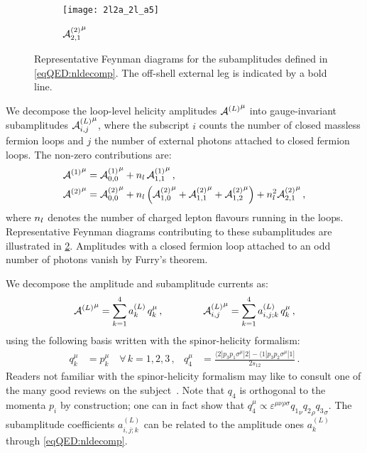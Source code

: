 \documentclass[main.tex]{subfiles}
\begin{document}
\begin{figure}
\begin{center}
\begin{subfigure}[c]{0.3\linewidth}
            \label{fig:2Lbox2}
        \end{subfigure}
        \begin{subfigure}[c]{0.3\linewidth}
            \centering
            \vspace{4ex}
            \texttt{[image: 2l2a\_2l\_a5]}
            \vspace{4ex}
            \caption{${\mathcal{A}^{(2)}_{2, 1}}^{\mu}$}
        \end{subfigure}
        \caption{
            Representative Feynman diagrams for the subamplitudes defined in \cref{eqQED:nldecomp}.
            The off-shell external leg is indicated by a bold line.
        }
        \label{fig:repr-diagrams}
    \end{center}
\end{figure}

We decompose the loop-level helicity amplitudes ${\mathcal{A}^{(L)}}^{\mu}$ into gauge-invariant
subamplitudes ${\mathcal{A}^{(L)}_{i, j}}^{\mu}$, where the subscript $i$ counts the number of
closed massless fermion loops and $j$ the number of external photons attached
to closed fermion loops. The non-zero contributions are:
\begin{subequations}
    \label{eqQED:nldecomp}
    \begin{align}
        {\mathcal{A}^{(1)}}^{\mu} &= {\mathcal{A}^{(1)}_{0, 0}}^{\mu} + n_l \, {\mathcal{A}^{(1)}_{1, 1}}^{\mu} \,, \\*
        {\mathcal{A}^{(2)}}^{\mu} &= {\mathcal{A}^{(2)}_{0, 0}}^{\mu}
        + n_l \left( {\mathcal{A}^{(2)}_{1, 0}}^{\mu} + {\mathcal{A}^{(2)}_{1, 1}}^{\mu} + {\mathcal{A}^{(2)}_{1, 2}}^{\mu} \right)
        + n_l^2 {\mathcal{A}^{(2)}_{2, 1}}^{\mu} \,,
    \end{align}
\end{subequations}
where $n_l$ denotes the number of charged lepton flavours running in the loops.
Representative Feynman diagrams contributing to these subamplitudes are illustrated in \cref{fig:repr-diagrams}.
Amplitudes with a closed fermion loop attached to an odd number of photons vanish by Furry's theorem.

We decompose the amplitude and subamplitude currents as:
\begin{align}
    \label{eqQED:offshellproj}
    {\mathcal{A}^{(L)}}^{\mu} = \sum_{k=1}^4 a_{k}^{(L)} \, q_k^\mu \,, \qquad \qquad {\mathcal{A}^{(L)}_{i, j}}^{\mu} = \sum_{k=1}^4 a_{i,j;k}^{(L)} \, q_k^\mu \,,
\end{align}
using the following basis written with the spinor-helicity formalism:
\begin{align}
    \label{eqQED:proj-basis}
    q_k^\mu &= p_k^\mu \quad\forall \, k=1,2,3 \,, &
    q_4^\mu &= \frac{\langle 2|p_3p_1\sigma^\mu|2 ] - \langle 1|p_3p_2\sigma^\mu|1 ]}{2 s_{12}} \,.
\end{align}
Readers not familiar with the spinor-helicity formalism may like to consult one of the many good reviews on the subject~\cite{Mangano:1990by,Dixon:1996wi,Badger:2023eqz}.
Note that $q_4$ is orthogonal to the momenta $p_i$ by construction; one can in fact show that $q_4^\mu\propto \varepsilon^{\mu\nu\rho\sigma}{q_1}_\nu{q_2}_\rho{q_3}_\sigma$. 
The subamplitude coefficients $a_{i,j;k}^{(L)}$ can be related to the amplitude ones $a_{k}^{(L)}$ through \cref{eqQED:nldecomp}.
\end{document}
